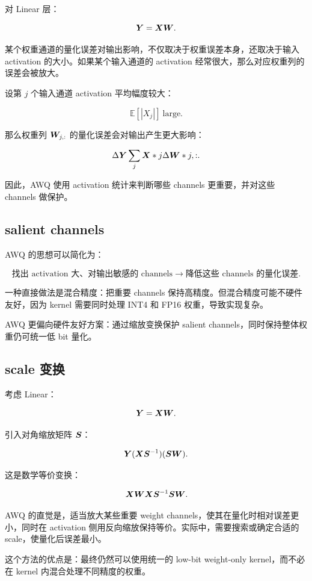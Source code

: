 对 Linear 层：

\[
\bm{Y}=\bm{X}\bm{W}.
\]

某个权重通道的量化误差对输出影响，不仅取决于权重误差本身，还取决于输入 activation 的大小。如果某个输入通道的 activation 经常很大，那么对应权重列的误差会被放大。

设第 $j$ 个输入通道 activation 平均幅度较大：

\[
\mathbb{E}[|X_j|]\ \text{large}.
\]

那么权重列 $\bm{W}_{j,:}$ 的量化误差会对输出产生更大影响：

\[
\Delta\bm{Y}
\sum_j
\bm{X}*j
\Delta\bm{W}*{j,:}.
\]

因此，AWQ 使用 activation 统计来判断哪些 channels 更重要，并对这些 channels 做保护。

\subsection{salient channels}
\label{subsec:awq-salient-channels}

AWQ 的思想可以简化为：

\[
\text{找出 activation 大、对输出敏感的 channels}
\rightarrow
\text{降低这些 channels 的量化误差}.
\]

一种直接做法是混合精度：把重要 channels 保持高精度。但混合精度可能不硬件友好，因为 kernel 需要同时处理 INT4 和 FP16 权重，导致实现复杂。

AWQ 更偏向硬件友好方案：通过缩放变换保护 salient channels，同时保持整体权重仍可统一低 bit 量化。

\subsection{scale 变换}
\label{subsec:awq-scale-transformation}

考虑 Linear：

\[
\bm{Y}=\bm{X}\bm{W}.
\]

引入对角缩放矩阵 $\bm{S}$：

\[
\bm{Y}
(\bm{X}\bm{S}^{-1})
(\bm{S}\bm{W}).
\]

这是数学等价变换：

\[
\bm{X}\bm{W}
\bm{X}\bm{S}^{-1}\bm{S}\bm{W}.
\]

AWQ 的直觉是，适当放大某些重要 weight channels，使其在量化时相对误差更小，同时在 activation 侧用反向缩放保持等价。实际中，需要搜索或确定合适的 scale，使量化后误差最小。

这个方法的优点是：最终仍然可以使用统一的 low-bit weight-only kernel，而不必在 kernel 内混合处理不同精度的权重。

